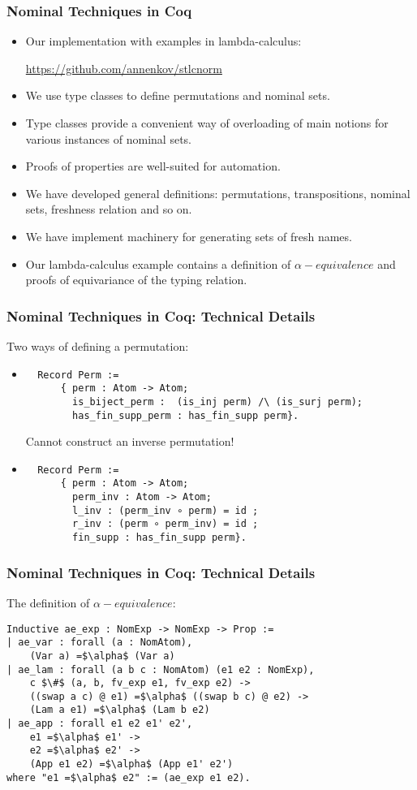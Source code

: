 \documentclass[10pt]{beamer}
\begin{document}
\begin{frame}
  \frametitle{Nominal Techniques in Coq}
  \begin{itemize}
  \item Our implementation with examples in lambda-calculus:

    \url{https://github.com/annenkov/stlcnorm}
  \item We use type classes to define permutations and nominal sets.
  \item Type classes provide a convenient way of overloading of main
    notions for various instances of nominal sets.
  \item Proofs of properties are well-suited for automation.
  \item We have developed general definitions: permutations,
    transpositions, nominal sets, freshness relation and so on.
  \item We have implement machinery for generating sets of fresh names.
  \item Our lambda-calculus example contains a definition of $\alpha-equivalence$
    and proofs of equivariance of the typing relation.
  \end{itemize}
\end{frame}

\begin{frame}[fragile]
  \frametitle{Nominal Techniques in Coq: Technical Details}
  Two ways of defining a permutation:
  \begin{itemize}
    \item
    \begin{lstlisting}
  Record Perm :=
      { perm : Atom -> Atom;
        is_biject_perm :  (is_inj perm) /\ (is_surj perm);
        has_fin_supp_perm : has_fin_supp perm}.
    \end{lstlisting}
    Cannot construct an inverse permutation!
  \item
  \begin{lstlisting}
  Record Perm :=
      { perm : Atom -> Atom;
        perm_inv : Atom -> Atom;
        l_inv : (perm_inv ∘ perm) = id ;
        r_inv : (perm ∘ perm_inv) = id ;
        fin_supp : has_fin_supp perm}.
  \end{lstlisting}
  \end{itemize}
\end{frame}

\begin{frame}[fragile]
  \frametitle{Nominal Techniques in Coq: Technical Details}
  The definition of $\alpha-equivalence$:
  \begin{lstlisting}
Inductive ae_exp : NomExp -> NomExp -> Prop :=
| ae_var : forall (a : NomAtom),
    (Var a) =$\alpha$ (Var a)
| ae_lam : forall (a b c : NomAtom) (e1 e2 : NomExp),
    c $\#$ (a, b, fv_exp e1, fv_exp e2) ->
    ((swap a c) @ e1) =$\alpha$ ((swap b c) @ e2) ->
    (Lam a e1) =$\alpha$ (Lam b e2)
| ae_app : forall e1 e2 e1' e2',
    e1 =$\alpha$ e1' ->
    e2 =$\alpha$ e2' ->
    (App e1 e2) =$\alpha$ (App e1' e2')
where "e1 =$\alpha$ e2" := (ae_exp e1 e2).
  \end{lstlisting}
\end{frame}
\end{document}
